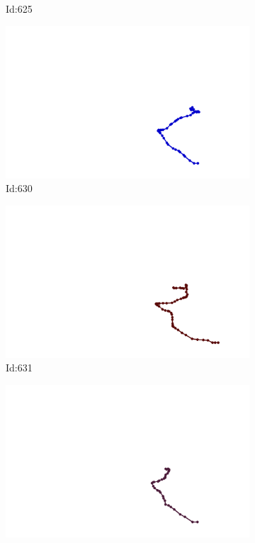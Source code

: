 \documentclass[12pt,twoside]{report}
\begin{document}
\begin{figure}
\begin{subfigure}[b]{0.20\textwidth}
\caption{Id:625}
\end{subfigure}
\begin{subfigure}[b]{0.20\textwidth}
\centering
\includegraphics[width=\textwidth]{../trajectories/630.png}
\caption{Id:630}
\end{subfigure}
\begin{subfigure}[b]{0.20\textwidth}
\centering
\includegraphics[width=\textwidth]{../trajectories/631.png}
\caption{Id:631}
\end{subfigure}
\begin{subfigure}[b]{0.20\textwidth}
\centering
\includegraphics[width=\textwidth]{../trajectories/641.png}

\end{subfigure}
\end{figure}
\end{document}
